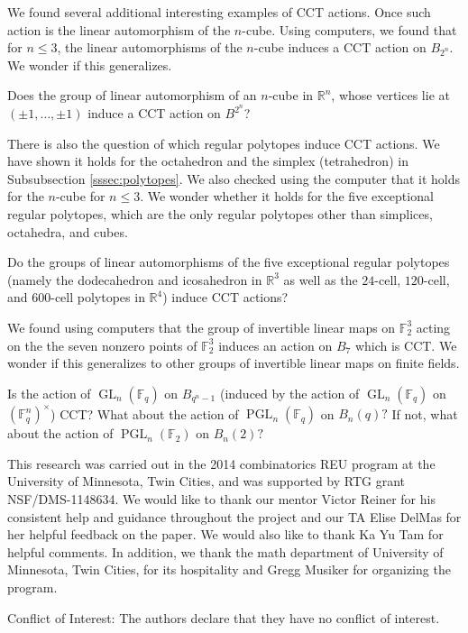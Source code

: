 \documentclass[smallextended]{svjour3}       %
\numberwithin{equation}{section}
\begin{document}
We found several additional interesting examples of CCT actions. Once such action is the linear automorphism of the $n$-cube. Using computers, we found that for $n \leq 3$, the linear automorphisms of the $n$-cube induces a CCT action on $B_{2^n}$. We wonder if this generalizes.

\begin{question}
\label{question:cube_cct}
Does the group of linear automorphism of an $n$-cube in $\mathbb R^n$, whose vertices lie at $(\pm 1, \ldots, \pm 1)$ induce a CCT action on $B^{2^n}$?
\end{question}

There is also the question of which regular polytopes induce CCT actions. We have shown it holds for the octahedron and the simplex (tetrahedron) in Subsubsection \ref{sssec:polytopes}. We also checked using the computer that it holds for the $n$-cube for $n \leq 3$. We wonder whether it holds for the five exceptional regular polytopes, which are the only regular polytopes other than simplices, octahedra, and cubes.

\begin{question}
\label{question:exceptional_polytopes_cct}
Do the groups of linear automorphisms of the five exceptional regular polytopes (namely the dodecahedron and icosahedron in $\mathbb R^3$ as well as the $24$-cell, $120$-cell, and $600$-cell polytopes in $\mathbb R^4$) induce CCT actions?
\end{question}

We found using computers that the group of invertible linear maps on $\mathbb F_2^3$ acting on the the seven nonzero points of $\mathbb F_2^3$ induces an action on $B_7$ which is CCT. We wonder if this generalizes to other groups of invertible linear maps on finite fields.

\begin{question}
Is the action of $\operatorname{GL}_n(\mathbb F_q)$ on $B_{q^n-1}$ (induced by the action of $\operatorname{GL}_n(\mathbb F_q)$ on $(\mathbb F_q^n)^\times$) CCT? What about the action of $\operatorname{PGL}_n(\mathbb F_q)$ on $B_n(q)?$ If not, what about the action of $\operatorname{PGL}_n(\mathbb F_2)$ on $B_n(2)?$ 
\end{question}

\begin{acknowledgements}
This research was carried out in the 2014 combinatorics REU program at the University of Minnesota, Twin Cities, and was supported by RTG grant NSF/DMS-1148634.
We would like to thank our mentor Victor Reiner for his consistent help and guidance throughout the project and our TA Elise DelMas for her helpful feedback on the paper. We would also like to thank Ka Yu Tam for helpful comments.  In addition, we thank the math department of University of Minnesota, Twin Cities, for its hospitality and Gregg Musiker for organizing the program.
\end{acknowledgements}

Conflict of Interest: The authors declare that they have no conflict of interest.

\medskip 

\nocite{*}



\end{document}
